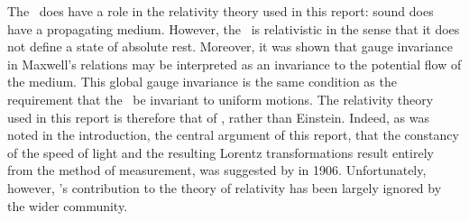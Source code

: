 










The \aether\ does have a role in the relativity theory used in this report:
sound does have a propagating medium.
However, the \aether\ is relativistic in the sense that it does not define a state of absolute rest. 
%
Moreover, it was shown that gauge invariance in Maxwell's relations may be interpreted as an invariance to the  potential flow of the medium.
This global gauge invariance is the same condition as the requirement that the \aether\ be invariant to uniform motions.
The relativity theory used in this report is therefore that of \Poincare, rather than Einstein.
Indeed, as was noted in the introduction,
the central argument of this report,
that the constancy of the speed of light and the resulting Lorentz transformations
result entirely from the method of measurement, 
was suggested by \Poincare in 1906\cite{Poincare1906}.
Unfortunately, however, \Poincare's contribution to the theory of relativity has been largely ignored by the wider community.


